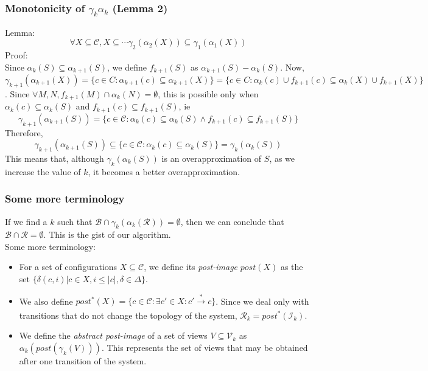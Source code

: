 \documentclass{beamer}
\begin{document}
{        \begin{frame}
            \frametitle{Monotonicity of $\gamma_{k}\alpha_{k}$ (Lemma 2)}
            Lemma:
            \begin{equation*}
                \forall X \subseteq \mathcal{C}, X \subseteq \cdots \gamma_{2}(\alpha_{2}(X)) \subseteq \gamma_{1}(\alpha_{1}(X))
            \end{equation*}
            Proof:\\
            Since $\alpha_{k}(S) \subseteq \alpha_{k + 1}(S)$, we define $f_{k + 1}(S)$ as $\alpha_{k + 1}(S) - \alpha_{k}(S)$.
            Now, $\gamma_{k + 1}(\alpha_{k + 1}(X)) = \{c \in C: \alpha_{k + 1}(c) \subseteq \alpha_{k + 1}(X)\} = \{c \in C: \alpha_{k}(c) \cup f_{k + 1}(c) \subseteq \alpha_{k}(X) \cup f_{k + 1}(X)\}$.
            Since $\forall M, N, f_{k+1}(M) \cap \alpha_{k}(N) = \emptyset$, this is possible only when $\alpha_{k}(c) \subseteq \alpha_{k}(S)$ and $f_{k+1}(c) \subseteq f_{k + 1}(S)$, ie 
            \begin{equation*}
                \gamma_{k + 1}(\alpha_{k + 1}(S)) = \{c \in \mathcal{C}: \alpha_{k}(c) \subseteq \alpha_{k}(S) \land f_{k + 1}(c) \subseteq f_{k + 1}(S)\}
            \end{equation*}
            Therefore, 
            \begin{equation*}
                \gamma_{k + 1}(\alpha_{k + 1}(S)) \subseteq \{c \in \mathcal{C}: \alpha_{k}(c) \subseteq \alpha_{k}(S)\} = \gamma_{k}(\alpha_{k}(S))
            \end{equation*}
            This means that, although $\gamma_{k}(\alpha_{k}(S))$ is an overapproximation of $S$, as we increase the value of $k$, it becomes a better overapproximation. 
        \end{frame}

        \begin{frame}
            \frametitle{Some more terminology}
            If we find a $k$ such that $\mathcal{B} \cap \gamma_{k}(\alpha_{k}(\mathcal{R})) = \emptyset$, then we can conclude that $\mathcal{B} \cap \mathcal{R} = \emptyset$. This is the gist of our algorithm.\\
            Some more terminology:
            \begin{itemize}
                \item For a set of configurations $X \subseteq \mathcal{C}$, we define its \textit{post-image} $post(X)$ as the set $\{\delta(c, i) | c \in X, i \leq |c|, \delta \in \Delta\}$.
                \item We also define $post^{*}(X) = \{c \in \mathcal{C} : \exists c' \in X : c' \xrightarrow[]{*} c \}$. Since we deal only with transitions that do not change the topology of the system, $\mathcal{R}_{k} = post^{*}(\mathcal{I}_{k})$.
                \item We define the \textit{abstract post-image} of a set of views $V \subseteq \mathcal{V}_{k}$ as $\alpha_{k}(post(\gamma_{k}(V)))$. This represents the set of views that may be obtained after one transition of the system.
            \end{itemize}
        \end{frame}
    }
\end{document}
